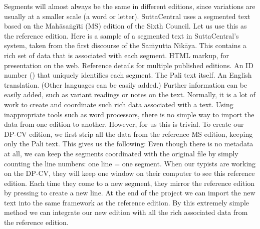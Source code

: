 {}Segments will almost always be the same in different editions, since variations are usually at a smaller scale (a word or letter).\markdownRendererInterblockSeparator
{}SuttaCentral uses a segmented text based on the Mahāsaṅgīti (MS) edition of the Sixth Council. Let us use this as the reference edition. Here is a sample of a segmented text in SuttaCentral’s system, taken from the first discourse of the Saṁyutta Nikāya.\markdownRendererInterblockSeparator
{}\markdownRendererInterblockSeparator
{}This contains a rich set of data that is associated with each segment.\markdownRendererInterblockSeparator
{}\markdownRendererOlBegin
{}HTML markup, for presentation on the web.\markdownRendererOlItemEnd 
{}Reference details for multiple published editions.\markdownRendererOlItemEnd 
{}An ID number () that uniquely identifies each segment.\markdownRendererOlItemEnd 
{}The Pali text itself.\markdownRendererOlItemEnd 
{}An English translation. (Other languages can be easily added.)\markdownRendererOlItemEnd 
\markdownRendererOlEnd \markdownRendererInterblockSeparator
{}Further information can be easily added, such as variant readings or notes on the text.\markdownRendererInterblockSeparator
{}Normally, it is a lot of work to create and coordinate such rich data associated with a text. Using inappropriate tools such as word processors, there is no simple way to import the data from one edition to another. However, for us this is trivial. To create our DP-CV edition, we first strip all the data from the reference MS edition, keeping only the Pali text. This gives us the following:\markdownRendererInterblockSeparator
{}\markdownRendererInterblockSeparator
{}Even though there is no metadata at all, we can keep the segments coordinated with the original file by simply counting the line numbers: one line = one segment.\markdownRendererInterblockSeparator
{}When our typists are working on the DP-CV, they will keep one window on their computer to see this reference edition. Each time they come to a new segment, they mirror the reference edition by pressing  to create a new line. At the end of the project we can import the new text into the same framework as the reference edition. By this extremely simple method we can integrate our new edition with all the rich associated data from the reference edition.\markdownRendererInterblockSeparator
